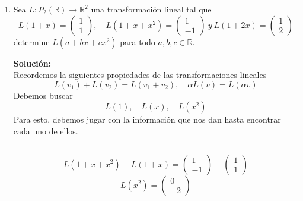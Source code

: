 \documentclass[12pt]{article}
\newenvironment{solucion}
{\begin{mdframed}[backgroundcolor=black!10]
		{\bf Solución:}\\
	}
	{
	\end{mdframed}
}
\newenvironment{preguntas}
{\begin{enumerate}\itemsep12pt
	}
	{
	\end{enumerate}
}
\newcommand{\ra}{\rightarrow}
\newcommand{\R}{\mathbb{R}}
\newcommand{\widesim}[2][1.5]{
	\mathrel{\overset{#2}{\scalebox{#1}[1]{$\sim$}}}
}
\newcommand{\wsim}{\widesim{}}
\begin{document}
\begin{preguntas}
\begin{solucion}
$$\begin{bmatrix}
		13\\
		9\\
		1
		\end{bmatrix}$$
		Viendolo en forma matricial,
		$$\left[
		\begin{array}{cc|c}
		5 &- 3 & 13\\
		4 & -1 & 9\\
		2 & 3 & 1
		\end{array}
		\right] \stackrel{F.E.R}{\wsim} \left[
		\begin{array}{cc|c}
		1 & 0 & 2\\
		0 & 1 & -1\\
		0 & 0 & 0
		\end{array}
		\right]$$
		Por lo que
		$$x_1 = 2, \quad x_2 = -1$$
		Finalmente,
		$$x = \begin{bmatrix}
		2 \\ -1
		\end{bmatrix}$$
\end{solucion}
\item Sea $L: P_2(\R) \ra \R^2$ una transformación lineal tal que
	$$L(1+x) = \begin{pmatrix}
	1\\
	1
	\end{pmatrix}, \quad L(1+x+x^2) = \begin{pmatrix}
	1\\
	-1
	\end{pmatrix}\ y \ L(1+2x) = \begin{pmatrix}
	1\\
	2
	\end{pmatrix}$$
	determine $L(a+bx+cx^2)$ para todo $a,b,c \in \R$.
\begin{solucion}
Recordemos la siguientes propiedades de las transformaciones lineales
		$$L(v_1) + L(v_2) = L(v_1 + v_2), \quad \alpha L(v) = L(\alpha v)$$
		Debemos buscar 
		$$L(1), \quad L(x), \quad L(x^2)$$
		Para esto, debemos jugar con la información que nos dan hasta encontrar cada uno de ellos.
		\begin{center}\rule{14.5cm}{0.1pt}\end{center}
		$$L(1+x+x^2) - L(1+x) = \begin{pmatrix}
		1\\-1
		\end{pmatrix} - \begin{pmatrix}
		1\\1
		\end{pmatrix}$$
		$$L(x^2) = \begin{pmatrix}
		0\\-2
		\end{pmatrix}$$
		

\end{solucion}
\end{preguntas}
\end{document}
